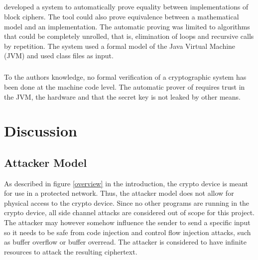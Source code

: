 \documentclass[fleqn]{kththesis}
\begin{document}
\paragraph{}
\textcite{automatic_block_cipher} developed a system to automatically prove equality between implementations of block ciphers. The tool could also prove equivalence between a mathematical model and an implementation. The automatic proving was limited to algorithms that could be completely unrolled, that is, elimination of loops and recursive calls by repetition. The system used a formal model of the Java Virtual Machine (JVM) and used class files as input. 

\paragraph{}
To the authors knowledge, no formal verification of a cryptographic system has been done at the machine code level. The automatic prover of \textcite{automatic_block_cipher} requires trust in the JVM, the hardware and that the secret key is not leaked by other means. 

\begin{comment}
	\paragraph{}
	An implementation of a hypervisor was shown to correspond to a model of the same hypervisor in \parencite{mads_verification_hypervisor}. They developed a tool to translate ARMv7 assembly programs to BIL (BAP Intermediate Language), used BAP to calculate weakest precondition. To calculate the weakest precondition they had to resolve all possible assignments to indirect jumps which they solved by using an SMT solver. 
\end{comment}




\chapter{Discussion}

\section{Attacker Model}
As described in figure \ref{overview} in the introduction, the crypto device is meant for use in a protected network. Thus, the attacker model does not allow for physical access to the crypto device. Since no other programs are running in the crypto device, all side channel attacks are considered out of scope for this project. The attacker may however somehow influence the sender to send a specific input so it needs to be safe from code injection and control flow injection attacks, such as buffer overflow or buffer overread. The attacker is considered to have infinite resources to attack the resulting ciphertext.
\end{document}
